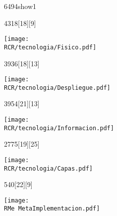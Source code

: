 \begin{NuevaPagina}{64}{94}{show1}
	\begin{NuevoParrafo}{43}{18}[18][9]
		\begin{Marco}[\LineaSupC][\LineaInfC][\LineaIzqC][\LineaDerC][CBlanco]
			\subseccionC{\PVFis}%
			\centering\texttt{[image: \\RCR/tecnologia/Fisico.pdf]}
		\end{Marco}
	\end{NuevoParrafo}
	
	
	\begin{NuevoParrafo}{39}{36}[18][13]
		\begin{Marco}[\LineaSupC][\LineaInfC][\LineaIzqC][\LineaDerC][CBlanco]
			\subseccionC{\PVDIm}%
			\centering\texttt{[image: \\RCR/tecnologia/Despliegue.pdf]}
		\end{Marco}
	\end{NuevoParrafo}
	\begin{NuevoParrafo}{39}{54}[21][13]
		\begin{Marco}[\LineaSupC][\LineaInfC][\LineaIzqC][\LineaDerC][CBlanco]			
			\subseccionC{\PVEIn}%
			\centering\texttt{[image: \\RCR/tecnologia/Informacion.pdf]}
		\end{Marco}
	\end{NuevoParrafo}
	
	\begin{NuevoParrafo}{27}{75}[19][25]
		\begin{Marco}[\LineaSupC][\LineaInfC][\LineaIzqC][\LineaDerC][CBlanco]			
			\subseccionC{\PVCap}%
			\centering\texttt{[image: \\RCR/tecnologia/Capas.pdf]}
		\end{Marco}
	\end{NuevoParrafo}
	
	\begin{NuevoParrafo}{54}{0}[22][9]
		\begin{Marco}[\LineaSupC][\LineaInfC][\LineaIzqC][\LineaDerC][CBlanco]
			\centering\texttt{[image: \\RMe MetaImplementacion.pdf]}
		\end{Marco}
	\end{NuevoParrafo}
	

\end{NuevaPagina}
